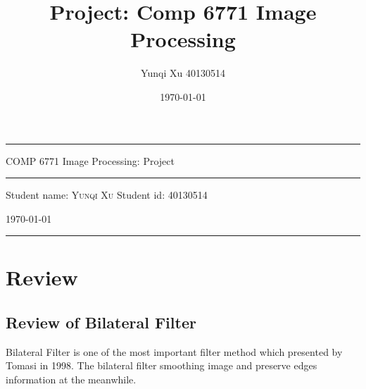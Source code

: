 \documentclass[12pt]{article}
\title{Project: Comp 6771 Image Processing}
\author{Yunqi Xu 40130514}
\date{\today}
\begin{document}

\begin{titlepage}
  \rule{\textwidth}{1pt}   %
    \vspace{0.2\textheight}  %


    {\Huge COMP 6771 Image Processing: Project}

    \vspace{0.025\textheight}   %

    \rule{0.83\textwidth}{0.4pt}  %

    \vspace{0.1\textheight}  %


    {\Large Student name: \textsc{Yunqi Xu}}
    \vfill
    {\Large Student id: 40130514}
    \vfill  %

    {\large \today}
    \vspace{0.1\textheight}  %


    \rule{\textwidth}{1pt}  %
\end{titlepage}

\section{Review}
\subsection{Review of Bilateral Filter}
Bilateral Filter is one of the most important filter method which presented by Tomasi in 1998. 
The bilateral filter smoothing image and preserve edges information at the meanwhile.
\end{document}

